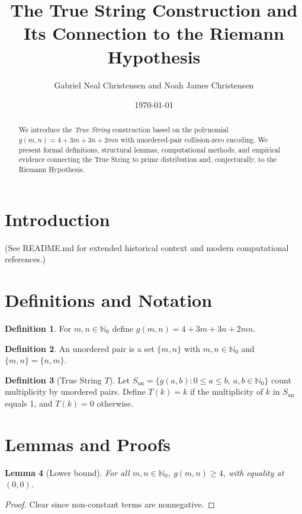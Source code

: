 \documentclass[12pt]{article}
\title{The True String Construction and Its Connection to the Riemann Hypothesis}
\author{Gabriel Neal Christensen and Noah James Christensen}
\date{\today}
\theoremstyle{definition}
\newtheorem{definition}{Definition}[section]
\theoremstyle{plain}
\newtheorem{lemma}[definition]{Lemma}
\begin{document}
\maketitle

\begin{abstract}
We introduce the \emph{True String} construction based on the polynomial
\(
g(m,n)=4+3m+3n+2mn\)
with unordered-pair collision-zero encoding. We present formal definitions, structural lemmas, computational methods, and empirical evidence connecting the True String to prime distribution and, conjecturally, to the Riemann Hypothesis.
\end{abstract}

\tableofcontents
\newpage

\section{Introduction}
(See README.md for extended historical context and modern computational references.)

\section{Definitions and Notation}
\begin{definition}
For $m,n\in\mathbb{N}_0$ define $g(m,n)=4+3m+3n+2mn$.
\end{definition}

\begin{definition}
An unordered pair is a set $\{m,n\}$ with $m,n\in\mathbb{N}_0$ and $\{m,n\}=\{n,m\}$.
\end{definition}

\begin{definition}[True String $T$]
Let $S_{\mathrm{un}}=\{ g(a,b) : 0\le a\le b,\ a,b\in\mathbb{N}_0\}$ count multiplicity by unordered pairs.
Define $T(k)=k$ if the multiplicity of $k$ in $S_{\mathrm{un}}$ equals 1, and $T(k)=0$ otherwise.
\end{definition}

\section{Lemmas and Proofs}
\begin{lemma}[Lower bound]
For all $m,n\in\mathbb{N}_0$, $g(m,n)\ge 4$, with equality at $(0,0)$.
\end{lemma}
\begin{proof}
Clear since non-constant terms are nonnegative.
\end{proof}
\end{document}
